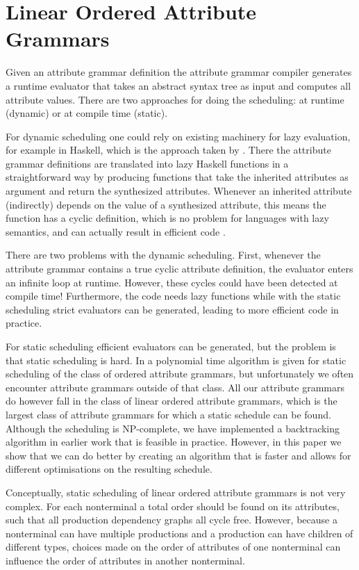 \documentclass{llncs}
\begin{document}
\section{Linear Ordered Attribute Grammars} \label{sect:loag}
Given an attribute grammar definition the attribute grammar compiler generates a runtime evaluator that takes an abstract syntax tree as input and computes all attribute values. There are two approaches for doing the scheduling: at runtime (dynamic) or at compile time (static).

For dynamic scheduling one could rely on existing machinery for lazy evaluation, for example in Haskell, which is the approach taken by \cite{saraiva99}. There the attribute grammar definitions are translated into lazy Haskell functions in a straightforward way by producing functions that take the inherited attributes as argument and return the synthesized attributes. Whenever an inherited attribute (indirectly) depends on the value of a synthesized attribute, this means the function has a cyclic definition, which is no problem for languages with lazy semantics, and can actually result in efficient code \cite{Bird:1984}.

There are two problems with the dynamic scheduling. First, whenever the attribute grammar contains a true cyclic attribute definition, the evaluator enters an infinite loop at runtime. However, these cycles could have been detected at compile time! Furthermore, the code needs lazy functions while with the static scheduling strict evaluators can be generated, leading to more efficient code in practice.

For static scheduling efficient evaluators can be generated, but the problem is that static scheduling is hard. In \cite{kastens80} a polynomial time algorithm is given for static scheduling of the class of ordered attribute grammars, but unfortunately we often encounter attribute grammars outside of that class. All our attribute grammars do however fall in the class of linear ordered attribute grammars, which is the largest class of attribute grammars for which a static schedule can be found. Although the scheduling is NP-complete, we have implemented a backtracking algorithm in earlier work \cite{Binsbergen:2015} that is feasible in practice. However, in this paper we show that we can do better by creating an algorithm that is faster and allows for different optimisations on the resulting schedule.

Conceptually, static scheduling of linear ordered attribute grammars is not very complex. For each nonterminal a total order should be found on its attributes, such that all production dependency graphs all cycle free. However, because a nonterminal can have multiple productions and a production can have children of different types, choices made on the order of attributes of one nonterminal can influence the order of attributes in another nonterminal.
\end{document}

